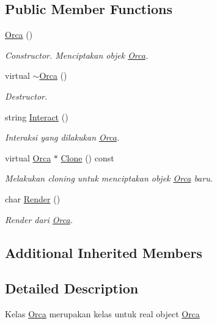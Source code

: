 \subsection*{Public Member Functions}
\begin{DoxyCompactItemize}
\item 
\hyperlink{classOrca_a1efb2589b67f95863f7c8a653cfb13f3}{Orca} ()
\begin{DoxyCompactList}\small\item\em Constructor. Menciptakan objek \hyperlink{classOrca}{Orca}. \end{DoxyCompactList}\item 
virtual \hyperlink{classOrca_a964d6cd8b816cfa70f5194457b9382c0}{$\sim$\+Orca} ()
\begin{DoxyCompactList}\small\item\em Destructor. \end{DoxyCompactList}\item 
string \hyperlink{classOrca_adf95ca04578ac04aaa717ef2dd11bf4c}{Interact} ()
\begin{DoxyCompactList}\small\item\em Interaksi yang dilakukan \hyperlink{classOrca}{Orca}. \end{DoxyCompactList}\item 
virtual \hyperlink{classOrca}{Orca} $\ast$ \hyperlink{classOrca_ac44eb30486ba4051eefa914dc8cd670f}{Clone} () const 
\begin{DoxyCompactList}\small\item\em Melakukan cloning untuk menciptakan objek \hyperlink{classOrca}{Orca} baru. \end{DoxyCompactList}\item 
char \hyperlink{classOrca_a0673bfc8e70af67b463a4fcae224d9d5}{Render} ()
\begin{DoxyCompactList}\small\item\em Render dari \hyperlink{classOrca}{Orca}. \end{DoxyCompactList}\end{DoxyCompactItemize}
\subsection*{Additional Inherited Members}


\subsection{Detailed Description}
Kelas \hyperlink{classOrca}{Orca} merupakan kelas untuk real object \hyperlink{classOrca}{Orca} 

